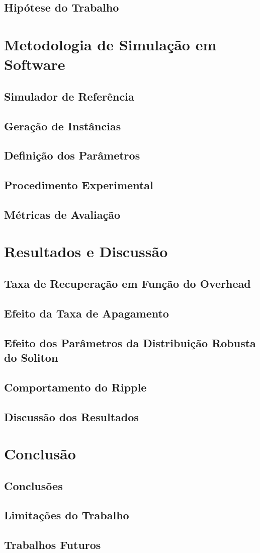 \section{Hipótese do Trabalho}

\chapter{Metodologia de Simulação em Software}

\section{Simulador de Referência}
\section{Geração de Instâncias}
\section{Definição dos Parâmetros}
\section{Procedimento Experimental}
\section{Métricas de Avaliação}

\chapter{Resultados e Discussão}

\section{Taxa de Recuperação em Função do Overhead}
\section{Efeito da Taxa de Apagamento}
\section{Efeito dos Parâmetros da Distribuição Robusta do Soliton}
\section{Comportamento do Ripple}
\section{Discussão dos Resultados}

\chapter{Conclusão}

\section{Conclusões}
\section{Limitações do Trabalho}
\section{Trabalhos Futuros}
